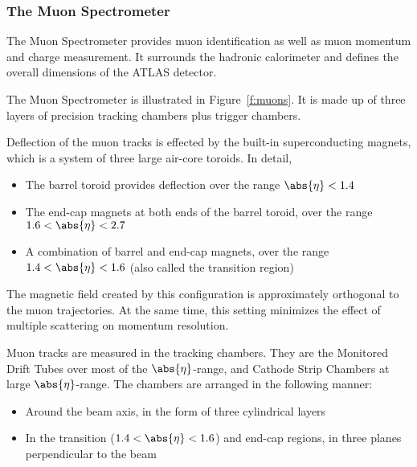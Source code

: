 \subsubsection{The Muon Spectrometer}\label{s:decmuons}

The Muon Spectrometer \cite{lhcaccexp} provides muon identification as well as
muon momentum and charge measurement. It surrounds the hadronic calorimeter and
defines the overall dimensions of the ATLAS detector.

The Muon Spectrometer is illustrated in Figure~\ref{f:muons}. It is made up of
three layers of precision tracking chambers plus trigger chambers.

Deflection of the muon tracks is effected by the built-in superconducting
magnets, which is a system of three large air-core toroids. In detail,

\begin{itemize}
	\item The barrel toroid provides deflection over the range $\abs{\eta} < 1.4$

	\item The end-cap magnets at both ends of the barrel toroid, over the range
	      $1.6 < \abs{\eta} < 2.7$

	\item A combination of barrel and end-cap magnets, over the range $1.4 <
		      \abs{\eta} < 1.6$ (also called the transition region)

\end{itemize}

The magnetic field created by this configuration is approximately orthogonal to
the muon trajectories. At the same time, this setting minimizes the effect of
multiple scattering on momentum resolution.


Muon tracks are measured in the tracking chambers. They are the Monitored Drift
Tubes over most of the $\abs{\eta}$-range, and Cathode Strip Chambers at large
$\abs{\eta}$-range. The chambers are arranged in the following manner:

\begin{itemize}
	\item Around the beam axis, in the form of three cylindrical layers

	\item In the transition ($1.4 < \abs{\eta} < 1.6$) and end-cap regions, in
	      three planes perpendicular to the beam

\end{itemize}

